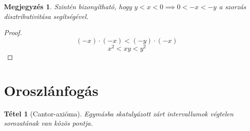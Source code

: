 \documentclass{article}
\newtheorem{theorem}{Tétel}
\newtheorem*{remark}{Megjegyzés}
\begin{document}
\begin{remark}
Szintén bizonyítható, hogy $y < x < 0 \implies 0 < -x < -y$ a szorzás disztributivitása segítségével.
\end{remark}

\begin{proof}
\[
(-x) \cdot (-x) < (-y) \cdot (-x)
\]
\[
x^2 < xy < y^2
\]
\end{proof}

\section{Oroszlánfogás}

\begin{theorem}[Cantor-axióma]
    Egymásba skatulyázott zárt intervallumok végtelen sorozatának van közös pontja.
\end{theorem}
\end{document}
